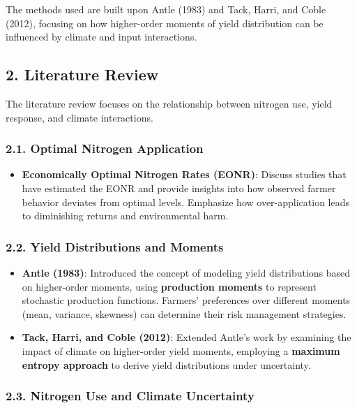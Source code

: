 \documentclass[
]{article}
\providecommand{\tightlist}{%
  \setlength{\itemsep}{0pt}\setlength{\parskip}{0pt}}\usepackage{longtable,booktabs,array}
\begin{document}
The methods used are built upon Antle (1983) and Tack, Harri, and Coble
(2012), focusing on how higher-order moments of yield distribution can
be influenced by climate and input interactions.

\subsection{2. Literature Review}\label{literature-review}

The literature review focuses on the relationship between nitrogen use,
yield response, and climate interactions.

\subsubsection{2.1. Optimal Nitrogen
Application}\label{optimal-nitrogen-application}

\begin{itemize}
\tightlist
\item
  \textbf{Economically Optimal Nitrogen Rates (EONR)}: Discuss studies
  that have estimated the EONR and provide insights into how observed
  farmer behavior deviates from optimal levels. Emphasize how
  over-application leads to diminishing returns and environmental harm.
\end{itemize}

\subsubsection{2.2. Yield Distributions and
Moments}\label{yield-distributions-and-moments}

\begin{itemize}
\tightlist
\item
  \textbf{Antle (1983)}: Introduced the concept of modeling yield
  distributions based on higher-order moments, using \textbf{production
  moments} to represent stochastic production functions. Farmers'
  preferences over different moments (mean, variance, skewness) can
  determine their risk management strategies.
\item
  \textbf{Tack, Harri, and Coble (2012)}: Extended Antle's work by
  examining the impact of climate on higher-order yield moments,
  employing a \textbf{maximum entropy approach} to derive yield
  distributions under uncertainty.
\end{itemize}

\subsubsection{2.3. Nitrogen Use and Climate
Uncertainty}\label{nitrogen-use-and-climate-uncertainty}
\end{document}
